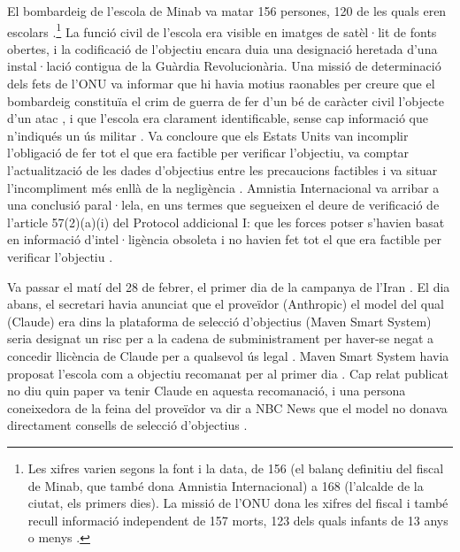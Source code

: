 El bombardeig de l'escola de Minab va matar 156 persones, 120 de les quals eren escolars \autocite[par.~92]{UNFFMIran2026}.\footnote{Les xifres varien segons la font i la data, de 156 (el balanç definitiu del fiscal de Minab, que també dona Amnistia Internacional) a 168 (l'alcalde de la ciutat, els primers dies). La missió de l'ONU dona les xifres del fiscal i també recull informació independent de 157 morts, 123 dels quals infants de 13 anys o menys \autocite[par.~92–93]{UNFFMIran2026}.} La funció civil de l'escola era visible en imatges de satèl·lit de fonts obertes, i la codificació de l'objectiu encara duia una designació heretada d'una instal·lació contigua de la Guàrdia Revolucionària. Una missió de determinació dels fets de l'ONU va informar que hi havia motius raonables per creure que el bombardeig constituïa el crim de guerra de fer d'un bé de caràcter civil l'objecte d'un atac \autocite{ohchr2026minabpress}, i que l'escola era clarament identificable, sense cap informació que n'indiqués un ús militar \autocite[par.~81–86, 124–126]{UNFFMIran2026}. Va concloure que els Estats Units van incomplir l'obligació de fer tot el que era factible per verificar l'objectiu, va comptar l'actualització de les dades d'objectius entre les precaucions factibles i va situar l'incompliment més enllà de la negligència \autocite[par.~124–125]{UNFFMIran2026}. Amnistia Internacional va arribar a una conclusió paral·lela, en uns termes que segueixen el deure de verificació de l'article 57(2)(a)(i) del Protocol addicional I: que les forces potser s'havien basat en informació d'intel·ligència obsoleta i no havien fet tot el que era factible per verificar l'objectiu \autocite{Amnesty2026Minab}.

Va passar el matí del 28 de febrer, el primer dia de la campanya de l'Iran \autocite{Amnesty2026Minab,crs2026iranwar}. El dia abans, el secretari havia anunciat que el proveïdor (Anthropic) el model del qual (Claude) era dins la plataforma de selecció d'objectius (Maven Smart System) seria designat un risc per a la cadena de subministrament per haver-se negat a concedir llicència de Claude per a qualsevol ús legal \autocite{npr2026openai}. Maven Smart System havia proposat l'escola com a objectiu recomanat per al primer dia \autocite{livingstone2026maven,gizmodo2026minab}. Cap relat publicat no diu quin paper va tenir Claude en aquesta recomanació, i una persona coneixedora de la feina del proveïdor va dir a NBC News que el model no donava directament consells de selecció d'objectius \autocite{nbc2026targeting}.

